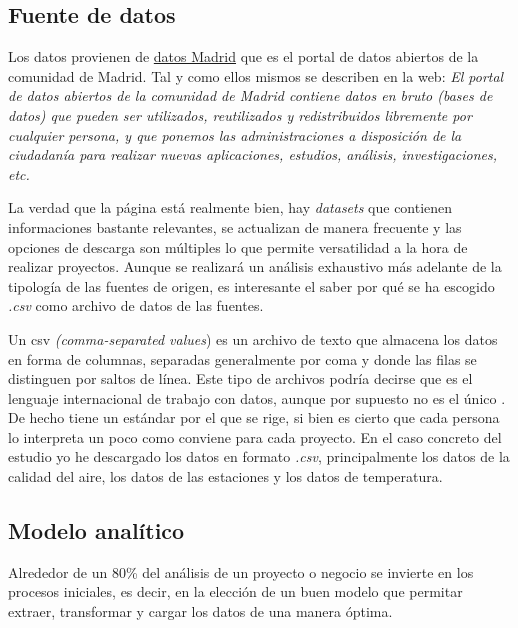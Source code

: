 \subsection{Fuente de  datos}

Los datos provienen de \href{https://datos.madrid.es}{datos Madrid} que es el portal de datos abiertos de la comunidad de Madrid. Tal y como ellos mismos se describen en la web: \textit{El portal de datos abiertos de la comunidad de Madrid contiene  datos en bruto (bases de datos) que pueden ser utilizados, reutilizados y redistribuidos libremente por cualquier persona, y que ponemos las administraciones a disposición de la ciudadanía para realizar nuevas aplicaciones, estudios, análisis, investigaciones, etc.}

La verdad que la página está realmente bien, hay \textit{datasets} que contienen informaciones bastante relevantes, se actualizan de manera frecuente y las opciones de descarga son múltiples lo que permite versatilidad a la hora de realizar proyectos. Aunque se realizará un análisis exhaustivo más adelante de la tipología de las fuentes de origen, es interesante el saber por qué se ha escogido\textit{ .csv} como archivo de datos de las fuentes. 


Un csv \textit{(comma-separated values}) es un archivo de texto que almacena los datos en forma de columnas, separadas generalmente por coma y donde las filas se distinguen por saltos de línea. Este tipo de archivos podría decirse que es el lenguaje internacional de trabajo con datos, aunque por supuesto no es el único \cite{formatos}. De hecho tiene un estándar \cite{estandar} por el que se rige, si bien es cierto que cada persona lo interpreta un poco como conviene para cada proyecto.
En el caso concreto del estudio yo he descargado los datos en formato \textit{.csv}, principalmente los datos de la calidad del aire, los datos de las estaciones y los datos de temperatura. 

\subsection{Modelo analítico}
Alrededor de un 80\% del análisis de un proyecto o negocio se invierte en los procesos iniciales, es decir, en la elección de un buen modelo que permitar extraer, transformar y cargar los datos de una manera óptima. 

